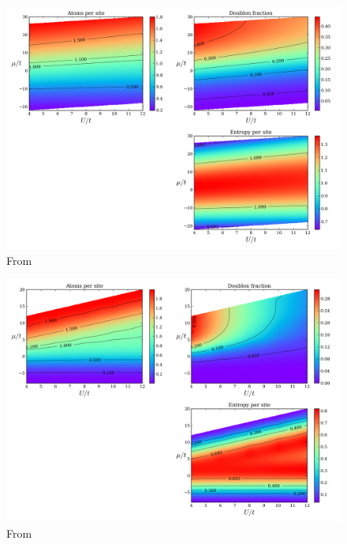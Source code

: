 \documentclass[11pt,letter]{article}
\begin{document}
\begin{figure}
\centering \includegraphics[width=\textwidth]{../HighT_figures/FUCHS_phasesT=100.png}
\caption[Low temperature phase diagram of the Fermi-Hubbard model]{\small
From~\cite{Fuchs2011}} \label{fig:fuchs10}
\end{figure}

\begin{figure}
\centering \includegraphics[width=\textwidth]{../HighT_figures/FUCHS_phasesT=10.png}
\caption[Low temperature phase diagram of the Fermi-Hubbard model]{\small
From~\cite{Fuchs2011}} \label{fig:fuchs10}
\end{figure}
   
\end{document}
